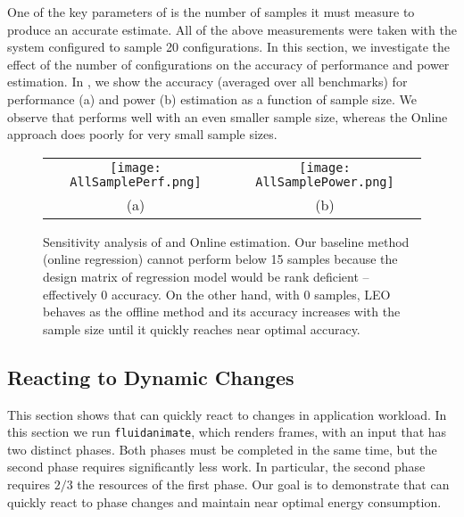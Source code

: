 One of the key parameters of \SYSTEMLEO{} is the number of samples it must
measure to produce an accurate estimate.  All of the above
measurements were taken with the system configured to sample 20
configurations.  In this section, we investigate the effect of the
number of configurations on the accuracy of performance and power
estimation. In , we show the accuracy
(averaged over all benchmarks) for performance (a) and power (b)
estimation as a function of sample size. We observe that \SYSTEMLEO{}
performs well with an even smaller sample size, whereas the Online
approach does poorly for very small sample sizes.
\begin{figure}
\begin{center}
\begin{tabular}[h]{cc}\hspace*{-15pt}
	 \texttt{[image: AllSamplePerf.png]}&
	\texttt{[image: AllSamplePower.png]}\\
	 {(a)} &
	 {(b)}
\end{tabular}
\end{center}

\caption{Sensitivity analysis of \SYSTEMLEO{} and Online estimation. Our
  baseline method (online regression) cannot perform below 15 samples
  because the design matrix of regression model would be rank
  deficient -- effectively 0 accuracy. On the other hand, with 0
  samples, LEO behaves as the offline method and its accuracy
  increases with the sample size until it quickly reaches near optimal
  accuracy. }
\label{fig:Sensitivity}
\end{figure}



\subsection{Reacting to Dynamic Changes}
\label{sec:controller}



This section shows that \SYSTEMLEO{} can quickly react to changes in
application workload.  In this section we run \texttt{fluidanimate},
which renders frames, with an input that has two distinct phases.
Both phases must be completed in the same time, but the second phase
requires significantly less work.  In particular, the second phase
requires $2/3$ the resources of the first phase.  Our goal is to
demonstrate that \SYSTEMLEO{} can quickly react to phase changes and
maintain near optimal energy consumption.

